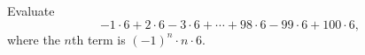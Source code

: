 Evaluate
\[-1\cdot6+2\cdot6-3\cdot6+\cdots+98\cdot6-99\cdot6+100\cdot6,\]
where the $n$th term is $(-1)^n\cdot n\cdot6$.
